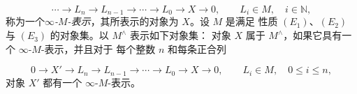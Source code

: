 \[
\cdots\longrightarrow L_n\longrightarrow L_{n-1}\longrightarrow\cdots
\longrightarrow L_0\longrightarrow X\longrightarrow0,
\qquad L_i\in M,\quad i\in\mathbb N,
\]
称为一个\emph{$\infty$-$M$-表示}，其所表示的对象为 $X$。设 $M$ 是满足
性质 $(E_1)$、$(E_2)$ 与 $(E_3)$ 的对象集。以 $M^{\wedge}$ 表示如下对象集：
对象 $X$ 属于 $M^{\wedge}$，如果它具有一个 $\infty$-$M$-表示，并且对于
每个整数 $n$ 和每条正合列

\[
0\longrightarrow X'\longrightarrow L_n\longrightarrow L_{n-1}
\longrightarrow\cdots\longrightarrow L_0\longrightarrow X\longrightarrow0,
\qquad L_i\in M,\quad 0\le i\le n,
\]
对象 $X'$ 都有一个 $\infty$-$M$-表示。
\endgroup

